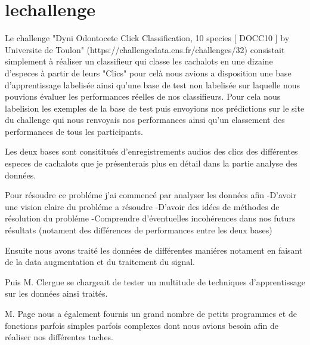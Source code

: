 \hypertarget{lechallenge}{%
\chapter{lechallenge}\label{lechallenge}}

Le challenge "Dyni Odontocete Click Classification, 10 species [ DOCC10 ]
by Universite de Toulon" (https://challengedata.ens.fr/challenges/32) consistait simplement à réaliser un classifieur qui classe les cachalots en une dizaine d'especes à partir de leurs "Clics" pour celà nous avions a disposition une base d'apprentissage labelisée ainsi qu'une base de test non labelisée sur laquelle nous pouvions évaluer les performances réelles de nos classifieurs. Pour cela nous labelision les exemples de la base de test puis envoyions nos prédictions sur le site du challenge qui nous renvoyais nos performances ainsi qu'un classement des performances de tous les participants.

Les deux bases sont consititués d'enregistrements audios des clics des différentes especes de cachalots que je présenterais plus en détail dans la partie analyse des données.

Pour résoudre ce probléme j'ai commencé par analyser les données afin
-D'avoir une vision claire du probléme a résoudre
-D'avoir des idées de méthodes de résolution du probléme
-Comprendre d'éventuelles incohérences dans nos futurs résultats (notament des différences de performances entre les deux bases)


Ensuite nous avons traité les données de différentes maniéres notament en faisant de la data augmentation et du traitement du signal.

Puis M. Clergue se chargeait de tester un multitude de techniques d'apprentissage sur les données ainsi traités.

M. Page nous a également fournis un grand nombre de petits programmes et de fonctions parfois simples parfois complexes dont nous avions besoin afin de réaliser nos différentes taches.
